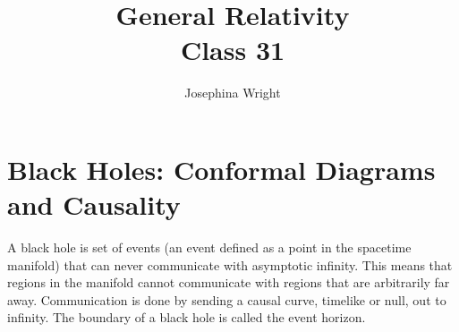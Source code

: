 \documentclass[10pt]{article}
\title{{\Huge General Relativity}\\{\Large{Class 31}}} %
\author{Josephina Wright}
\begin{document}
    \maketitle
    \flushbottom
    \newpage
    \pagestyle{fancynotes}
    \part{Black Holes: Conformal Diagrams and Causality}

\newline  A black hole is set of events (an event defined as a point in the spacetime manifold) that can never communicate with asymptotic infinity. This means that regions in the manifold cannot communicate with regions that are arbitrarily far away. Communication is done by sending a causal curve, timelike or null, out to infinity. 
	The boundary of a black hole is called the event horizon.
\end{document}
